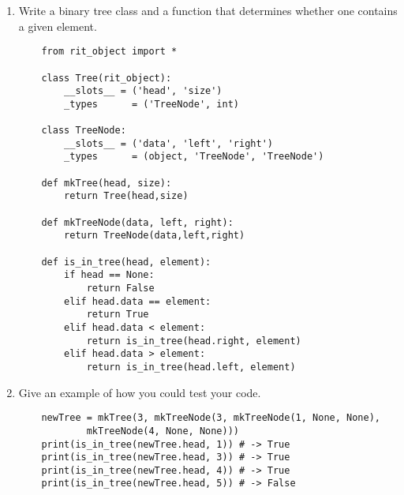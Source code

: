 \begin{enumerate}

\item Write a binary tree class and a function that determines whether one contains a given element.
\begin{answer}
\begin{lstlisting}
	from rit_object import *

	class Tree(rit_object):
		__slots__ = ('head', 'size')
		_types      = ('TreeNode', int)

	class TreeNode:
		__slots__ = ('data', 'left', 'right')
		_types      = (object, 'TreeNode', 'TreeNode')

	def mkTree(head, size):
		return Tree(head,size)

	def mkTreeNode(data, left, right):
		return TreeNode(data,left,right)

	def is_in_tree(head, element):
		if head == None:
			return False
		elif head.data == element:
			return True
		elif head.data < element:
			return is_in_tree(head.right, element)
		elif head.data > element:
			return is_in_tree(head.left, element)
\end{lstlisting}
\end{answer}

\item Give an example of how you could test your code.
\begin{answer}
\begin{lstlisting}
	newTree = mkTree(3, mkTreeNode(3, mkTreeNode(1, None, None),
			mkTreeNode(4, None, None)))
	print(is_in_tree(newTree.head, 1)) # -> True
	print(is_in_tree(newTree.head, 3)) # -> True
	print(is_in_tree(newTree.head, 4)) # -> True
	print(is_in_tree(newTree.head, 5)) # -> False
\end{lstlisting}
\end{answer}

\end{enumerate}
